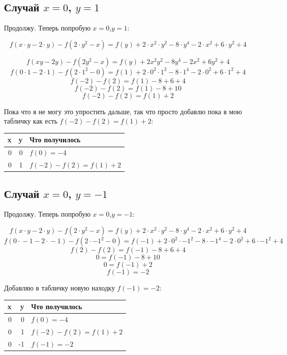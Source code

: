 \documentclass{article}
\begin{document}
\subsection{Случай $x=0$, $y=1$}
Продолжу. Теперь попробую {\boldmath $x=0$,$y=1$}:

$$f(x\cdot{}y-2\cdot{}y)-f(2\cdot{}y^2-x)=f(y)+2\cdot{}x^2\cdot{}y^2-8\cdot{}y^4-2\cdot{}x^2+6\cdot{}y^2+4$$


$$f(xy-2y)-f(2y^2-x)=f(y)+2x^2y^2-8y^4-2x^2+6y^2+4$$
$$f(0\cdot{}1-2\cdot{}1)-f(2\cdot{}1^2-0)=f(1)+2\cdot{}0^2\cdot{}1^2-8\cdot{}1^4-2\cdot{}0^2+6\cdot{}1^2+4$$
$$f(-2)-f(2)=f(1)-8+6+4$$
$$f(-2)-f(2)=f(1)-8+10$$
$$f(-2)-f(2)=f(1)+2$$

\begin{samepage}
Пока что я не могу это упростить дальше, так что просто добавлю пока в мою табличку как есть {\boldmath\color{red} $f(-2)-f(2)=f(1)+2$}:
\begin{center}
 \begin{tabular}{r r l}
 \hline
 x & y & Что получилось      \\
 \hline
 0 & 0 & $f(0)=-4$           \\
 0 & 1 & $f(-2)-f(2)=f(1)+2$ \\
 \hline
 \end{tabular}
\end{center}
\end{samepage}

\subsection{Случай $x=0$, $y=-1$}
Продолжу. Теперь попробую {\boldmath $x=0$,$y=-1$}:

$$f(x\cdot{}y-2\cdot{}y)-f(2\cdot{}y^2-x)=f(y)+2\cdot{}x^2\cdot{}y^2-8\cdot{}y^4-2\cdot{}x^2+6\cdot{}y^2+4$$
$$f(0\cdot{}-1-2\cdot{}-1)-f(2\cdot{}{-1}^2-0)=f(-1)+2\cdot{}0^2\cdot{}{-1}^2-8\cdot{}{-1}^4-2\cdot{}0^2+6\cdot{}{-1}^2+4$$
$$f(2)-f(2)=f(-1)-8+6+4$$
$$0=f(-1)-8+10$$
$$0=f(-1)+2$$
$$f(-1)=-2$$

\begin{samepage}
Добавляю в табличку новую находку {\boldmath\color{red} $f(-1)=-2$}:
\begin{center}
 \begin{tabular}{r r l}
 \hline
 x & y & Что получилось       \\
 \hline
 0 &  0 & $f(0)=-4$           \\
 0 &  1 & $f(-2)-f(2)=f(1)+2$ \\
 0 & -1 & $f(-1)=-2$ \\
 \hline
 \end{tabular}
\end{center}
\end{samepage}
\end{document}
